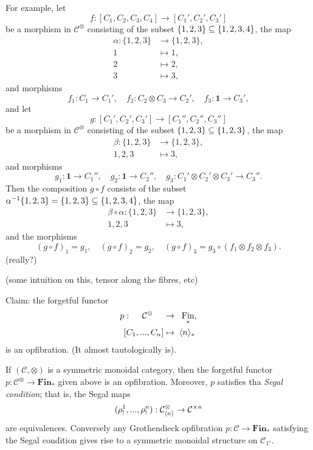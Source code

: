 \documentclass{MetricNotes2023}
\def\subq{\ensuremath\subseteq}
\DeclareMathOperator{\Fin}{Fin}
\begin{document}
For example, let 
\[f : [C_1, C_2, C_3, C_4]\to [C_1', C_2', C_3']\]
be a morphism in \(\mathcal{C}^\otimes\) consisting of the subset \(\{1, 2, 3\}\subq \{1, 2, 3, 4\}\), the map
\begin{align*}
\alpha : \{1, 2, 3\}&\to \{1, 2, 3\},\\
1 &\mapsto 1,\\
2 &\mapsto 2,\\
3 &\mapsto 3,
\end{align*}
and morphisms
\[f_1 : C_1 \to C_1', \quad f_2 : C_2 \otimes C_3 \to C_2', \quad f_3 : \textbf{1}\to C_3',\]
and let 
\[g : [C_1', C_2', C_3'] \to [C_1'', C_2'', C_3'']\]
be a morphism in \(\mathcal{C}^\otimes\) consisting of the subset \(\{1, 2, 3\}\subq \{1, 2, 3\}\), the map
\begin{align*}
\beta : \{1, 2, 3\}&\to \{1, 2, 3\},\\
1, 2, 3 &\mapsto 3,
\end{align*}
and morphisms
\[g_1 : \textbf{1} \to C_1'', \quad g_2 : \textbf{1} \to C_2'', \quad g_3 : C_1'\otimes C_2'\otimes C_3' \to C_3''.\]
Then the composition \(g \circ f \) consists of the subset \(\alpha^{-1}\{1, 2, 3\}=\{1, 2, 3\}\subq \{1, 2, 3, 4\}\), the map
\begin{align*}
\beta \circ \alpha : \{1, 2, 3\}&\to \{1, 2, 3\},\\
1, 2, 3 &\mapsto 3,
\end{align*}
and the morphisms
\[(g\circ f)_1 =g_1, \quad (g\circ f)_2 = g_2, \quad (g \circ f)_3 = g_3 \circ (f_1 \otimes f_2 \otimes f_3).\]
(really?)

(some intuition on this, tensor along the fibres, etc)

Claim: the forgetful functor
\begin{align*}
p : \quad\;\mathcal{C}^\otimes \quad\;&\to \;\;\Fin_*,\\
[C_1, ..., C_n] &\mapsto \;\ang{n}_*
\end{align*}
is an opfibration. (It almost tautologically is). 

\begin{proposition}
If \((\mathcal{C}, \otimes)\) is a symmetric monoidal category, then the forgetful functor \(p : \mathcal{C}^\otimes \to \textbf{Fin}_*\) given above is an opfibration. Moreover, \(p\) satisfies tha \textit{Segal condition}; that is, the Segal maps 
\[(\rho_!^1, ..., \rho_!^n) : \mathcal{C}^\otimes_{\langle n\rangle}\to \mathcal{C}^{\times n}\]
are equivalences. Conversely any Grothendieck opfibration \(p : \mathcal{C} \to \textbf{Fin}_*\) satisfying the Segal condition gives rise to a symmetric monoidal structure on \(\mathcal{C}_{\ang{1}}\).
\end{proposition}
\end{document}
